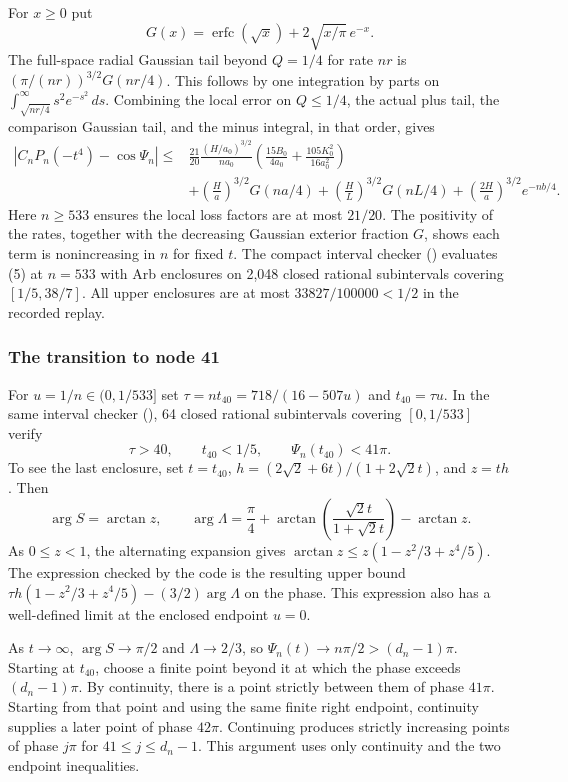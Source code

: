 \documentclass[11pt]{article}
\begin{document}
For $x\ge0$ put
\[
G(x)=\operatorname{erfc}(\sqrt{x})+2\sqrt{x/\pi}\,e^{-x}.
\]
The full-space radial Gaussian tail beyond $Q=1/4$ for rate $nr$ is $(\pi/(nr))^{3/2}G(nr/4)$. This follows by one integration by parts on $\int_{\sqrt{nr/4}}^\infty s^2e^{-s^2}\,ds$. Combining the local error on $Q\le1/4$, the actual plus tail, the comparison Gaussian tail, and the minus integral, in that order, gives
\[
\begin{aligned}
|C_nP_n(-t^4)-\cos\Psi_n|
\le {}&
\frac{21}{20}\frac{(H/a_0)^{3/2}}{n a_0}
  \left(\frac{15B_0}{4a_0}+\frac{105K_0^2}{16a_0^2}\right)\\
&+\left(\frac H a\right)^{3/2}G(na/4)
 +\left(\frac H L\right)^{3/2}G(nL/4)
 +\left(\frac{2H}{a}\right)^{3/2}e^{-nb/4}.
\end{aligned}
\tag{5}
\]
Here $n\ge533$ ensures the local loss factors are at most $21/20$. The positivity of the rates, together with the decreasing Gaussian exterior fraction $G$, shows each term is nonincreasing in $n$ for fixed $t$. The compact interval checker () evaluates (5) at $n=533$ with Arb enclosures on 2,048 closed rational subintervals covering $[1/5,38/7]$. All upper enclosures are at most $33827/100000<1/2$ in the recorded replay.

\subsubsection{The transition to node 41}
\label{sec:the-transition-to-node-41}

For $u=1/n\in(0,1/533]$ set $\tau=nt_{40}=718/(16-507u)$ and $t_{40}=\tau u$. In the same interval checker (), 64 closed rational subintervals covering $[0,1/533]$ verify
\[
\tau>40,\qquad t_{40}<1/5,\qquad \Psi_n(t_{40})<41\pi.
\tag{6}
\]
To see the last enclosure, set $t=t_{40}$, $h=(2\sqrt2+6t)/(1+2\sqrt2t)$, and $z=th$. Then
\[
\arg S=\arctan z,\qquad
\arg\Lambda=\frac{\pi}{4}+\arctan\left(\frac{\sqrt2t}{1+\sqrt2t}\right)-\arctan z.
\]
As $0\le z<1$, the alternating expansion gives $\arctan z\le z(1-z^2/3+z^4/5)$. The expression checked by the code is the resulting upper bound $\tau h(1-z^2/3+z^4/5)-(3/2)\arg\Lambda$ on the phase. This expression also has a well-defined limit at the enclosed endpoint $u=0$.

As $t\to\infty$, $\arg S\to\pi/2$ and $\Lambda\to2/3$, so $\Psi_n(t)\to n\pi/2>(d_n-1)\pi$. Starting at $t_{40}$, choose a finite point beyond it at which the phase exceeds $(d_n-1)\pi$. By continuity, there is a point strictly between them of phase $41\pi$. Starting from that point and using the same finite right endpoint, continuity supplies a later point of phase $42\pi$. Continuing produces strictly increasing points of phase $j\pi$ for $41\le j\le d_n-1$. This argument uses only continuity and the two endpoint inequalities.
\end{document}
